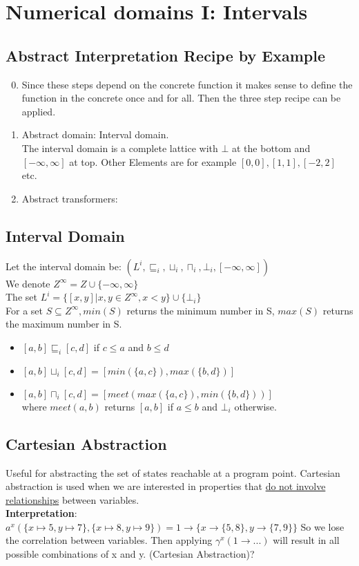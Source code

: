 \chapter{Numerical domains I: Intervals}
\section{Abstract Interpretation Recipe by Example}
\begin{enumerate}
\setcounter{enumi}{-1}
\item Since these steps depend on the concrete function it makes sense to define the function in the concrete once and for all. Then the three step recipe can be applied.
\item Abstract domain: Interval domain. \\
The interval domain is a complete lattice with $\bot$ at the bottom and $[-\infty,\infty]$ at top. Other Elements are for example $[0,0], [1,1], [-2,2]$ etc.
\item Abstract transformers: 
\end{enumerate}

\section{Interval Domain}
Let the interval domain be: $(L^i, \sqsubseteq_i, \sqcup_i, \sqcap_i, \bot_i, [-\infty,\infty])$ \\
We denote $Z^\infty = Z \cup \{-\infty, \infty\}$ \\
The set $L^i=\{[x,y] | x,y \in Z^\infty, x<y\} \cup \{\bot_i\}$ \\
For a set $S \subseteq Z^\infty, min(S)$ returns the minimum number in S, $max(S)$ returns the maximum number in S.
\begin{itemize}
\item $[a,b] \sqsubseteq_i [c,d]$ if $c \leq a$ and $b \leq d$
\item $[a,b] \sqcup_i [c,d] = [min(\{a,c\}), max(\{b,d\})]$
\item $[a,b] \sqcap_i [c,d] = [meet(max(\{a,c\}), min(\{b,d\}))]$ \\ where $meet(a,b)$ returns $[a,b]$ if $a \leq b$ and $\bot_i$ otherwise.
\end{itemize} 

\section{Cartesian Abstraction}
Useful for abstracting the set of states reachable at a program point. Cartesian abstraction is used when we are interested in properties that \underline{do not involve relationships} between variables.\\
\textbf{Interpretation}: $a^x(\{x \mapsto 5, y \mapsto 7 \}, \{x \mapsto 8, y \mapsto 9\}) = 1 \to \{x \to \{5,8\}, y \to \{7,9\}\}$ So we lose the correlation between variables. Then applying $\gamma^x(1 \to ...)$ will result in all possible combinations of x and y. (Cartesian Abstraction)?

